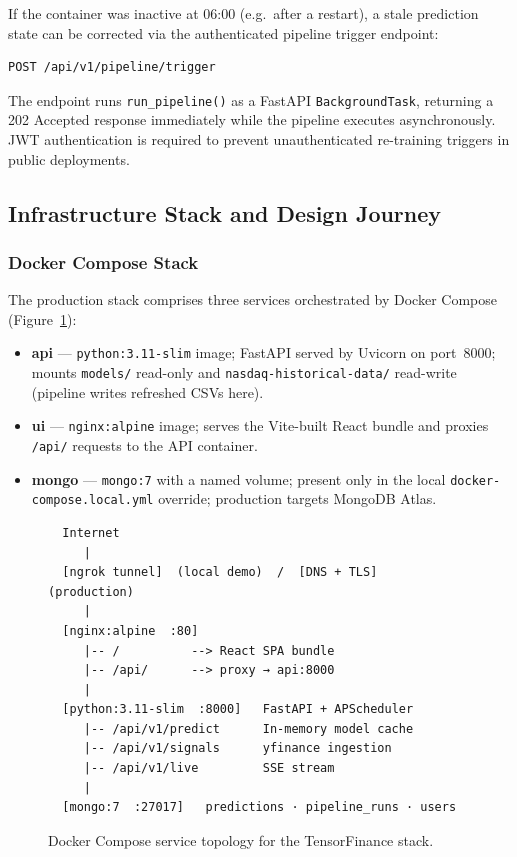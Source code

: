 \documentclass[12pt, a4paper]{article}
\begin{document}
If the container was inactive at 06:00 (e.g.\ after a restart), a
stale prediction state can be corrected via the authenticated
pipeline trigger endpoint:

\begin{verbatim}
POST /api/v1/pipeline/trigger
\end{verbatim}

The endpoint runs \texttt{run\_pipeline()} as a FastAPI
\texttt{BackgroundTask}, returning a 202 Accepted response
immediately while the pipeline executes asynchronously.
JWT authentication is required to prevent unauthenticated
re-training triggers in public deployments.

\subsection{Infrastructure Stack and Design Journey}

\subsubsection{Docker Compose Stack}

The production stack comprises three services orchestrated by
Docker Compose (Figure~\ref{fig:stack}):

\begin{itemize}
  \item \textbf{api} --- \texttt{python:3.11-slim} image;
    FastAPI served by Uvicorn on port~8000; mounts
    \texttt{models/} read-only and \texttt{nasdaq-historical-data/}
    read-write (pipeline writes refreshed CSVs here).
  \item \textbf{ui} --- \texttt{nginx:alpine} image; serves the
    Vite-built React bundle and proxies \texttt{/api/} requests
    to the API container.
  \item \textbf{mongo} --- \texttt{mongo:7} with a named volume;
    present only in the local \texttt{docker-compose.local.yml}
    override; production targets MongoDB Atlas.
\end{itemize}

\begin{figure}[h]
\centering
\begin{verbatim}
  Internet
     |
  [ngrok tunnel]  (local demo)  /  [DNS + TLS]  (production)
     |
  [nginx:alpine  :80]
     |-- /          --> React SPA bundle
     |-- /api/      --> proxy → api:8000
     |
  [python:3.11-slim  :8000]   FastAPI + APScheduler
     |-- /api/v1/predict      In-memory model cache
     |-- /api/v1/signals      yfinance ingestion
     |-- /api/v1/live         SSE stream
     |
  [mongo:7  :27017]   predictions · pipeline_runs · users
\end{verbatim}
\caption{Docker Compose service topology for the TensorFinance stack.}
\label{fig:stack}
\end{figure}
\end{document}
